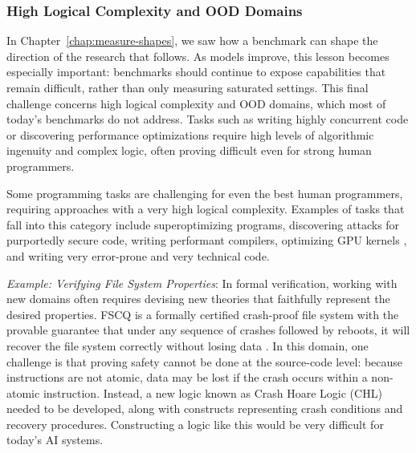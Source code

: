 

\subsubsection{High Logical Complexity and OOD Domains} \label{sec:c-ood-domains}

In Chapter~\ref{chap:measure-shapes}, we saw how a benchmark can shape the direction of the research that follows.
As models improve, this lesson becomes especially important: benchmarks should continue to expose capabilities that remain difficult, rather than only measuring saturated settings.
This final challenge concerns high logical complexity and OOD domains, which most of today's benchmarks do not address. Tasks such as writing highly concurrent code or discovering performance optimizations require high levels of algorithmic ingenuity and complex logic, often proving difficult even for strong human programmers.

Some programming tasks are challenging for even the best human programmers, requiring approaches with a very high logical complexity. Examples of tasks that fall into this category include superoptimizing programs, discovering attacks for purportedly secure code, writing performant compilers, optimizing GPU kernels \citep{ouyang2024kernelbench}, and writing very error-prone and very technical code. 



\textit{Example: Verifying File System Properties}: In formal verification, working with new domains often requires devising new theories that faithfully represent the desired properties. FSCQ is a formally certified crash-proof file system with the provable guarantee that under any sequence of crashes followed by reboots, it will recover the file system correctly without losing data \citep{chen2015using}. In this domain, one challenge is that proving safety cannot be done at the source-code level: because instructions are not atomic, data may be lost if the crash occurs within a non-atomic instruction. Instead, a new logic known as Crash Hoare Logic (CHL) needed to be developed, along with constructs representing crash conditions and recovery procedures. Constructing a logic like this would be very difficult for today's AI systems.

